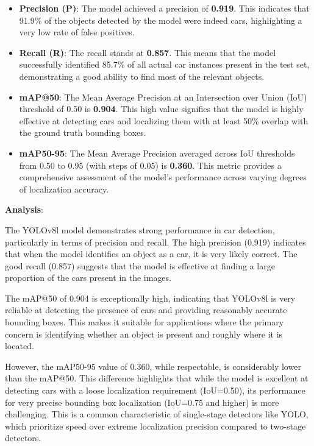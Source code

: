\documentclass[conference]{IEEEtran}
\begin{document}
\begin{itemize}
    \item \textbf{Precision (P)}: The model achieved a precision of \textbf{0.919}. This indicates that 91.9\% of the objects detected by the model were indeed cars, highlighting a very low rate of false positives.
    \item \textbf{Recall (R)}: The recall stands at \textbf{0.857}. This means that the model successfully identified 85.7\% of all actual car instances present in the test set, demonstrating a good ability to find most of the relevant objects.
    \item \textbf{mAP@50}: The Mean Average Precision at an Intersection over Union (IoU) threshold of 0.50 is \textbf{0.904}. This high value signifies that the model is highly effective at detecting cars and localizing them with at least 50\% overlap with the ground truth bounding boxes.
    \item \textbf{mAP50-95}: The Mean Average Precision averaged across IoU thresholds from 0.50 to 0.95 (with steps of 0.05) is \textbf{0.360}. This metric provides a comprehensive assessment of the model's performance across varying degrees of localization accuracy.
\end{itemize}

\textbf{Analysis}:

The YOLOv8l model demonstrates strong performance in car detection, particularly in terms of precision and recall. The high precision (0.919) indicates that when the model identifies an object as a car, it is very likely correct. The good recall (0.857) suggests that the model is effective at finding a large proportion of the cars present in the images.

The mAP@50 of 0.904 is exceptionally high, indicating that YOLOv8l is very reliable at detecting the presence of cars and providing reasonably accurate bounding boxes. This makes it suitable for applications where the primary concern is identifying whether an object is present and roughly where it is located.

However, the mAP50-95 value of 0.360, while respectable, is considerably lower than the mAP@50. This difference highlights that while the model is excellent at detecting cars with a loose localization requirement (IoU=0.50), its performance for very precise bounding box localization (IoU=0.75 and higher) is more challenging. This is a common characteristic of single-stage detectors like YOLO, which prioritize speed over extreme localization precision compared to two-stage detectors.
\end{document}
